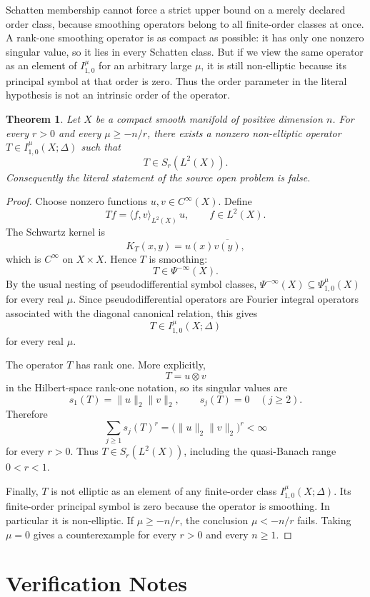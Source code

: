\documentclass[11pt]{article}
\newtheorem{theorem}{Theorem}
\begin{document}
Schatten membership cannot force a strict upper bound on a merely declared
order class, because smoothing operators belong to all finite-order classes at
once.  A rank-one smoothing operator is as compact as possible: it has only one
nonzero singular value, so it lies in every Schatten class.  But if we view the
same operator as an element of \(I^\mu_{1,0}\) for an arbitrary large
\(\mu\), it is still non-elliptic because its principal symbol at that order
is zero.  Thus the order parameter in the literal hypothesis is not an
intrinsic order of the operator.

\begin{theorem}
Let \(X\) be a compact smooth manifold of positive dimension \(n\).  For every
\(r>0\) and every \(\mu\ge -n/r\), there exists a nonzero non-elliptic
operator \(T\in I^\mu_{1,0}(X;\Delta)\) such that
\[
  T\in S_r(L^2(X)).
\]
Consequently the literal statement of the source open problem is false.
\end{theorem}

\begin{proof}
Choose nonzero functions \(u,v\in C^\infty(X)\).  Define
\[
  Tf=\langle f,v\rangle_{L^2(X)}\,u,\qquad f\in L^2(X).
\]
The Schwartz kernel is
\[
  K_T(x,y)=u(x)\overline{v(y)},
\]
which is \(C^\infty\) on \(X\times X\).  Hence \(T\) is smoothing:
\[
  T\in \Psi^{-\infty}(X).
\]
By the usual nesting of pseudodifferential symbol classes,
\(\Psi^{-\infty}(X)\subseteq \Psi^\mu_{1,0}(X)\) for every real \(\mu\).
Since pseudodifferential operators are Fourier integral operators associated
with the diagonal canonical relation, this gives
\[
  T\in I^\mu_{1,0}(X;\Delta)
\]
for every real \(\mu\).

The operator \(T\) has rank one.  More explicitly,
\[
  T = u\otimes v
\]
in the Hilbert-space rank-one notation, so its singular values are
\[
  s_1(T)=\|u\|_2\|v\|_2,\qquad s_j(T)=0\quad(j\ge2).
\]
Therefore
\[
  \sum_{j\ge1}s_j(T)^r = \bigl(\|u\|_2\|v\|_2\bigr)^r<\infty
\]
for every \(r>0\).  Thus \(T\in S_r(L^2(X))\), including the quasi-Banach
range \(0<r<1\).

Finally, \(T\) is not elliptic as an element of any finite-order class
\(I^\mu_{1,0}(X;\Delta)\).  Its finite-order principal symbol is zero because
the operator is smoothing.  In particular it is non-elliptic.  If
\(\mu\ge -n/r\), the conclusion \(\mu<-n/r\) fails.  Taking \(\mu=0\) gives a
counterexample for every \(r>0\) and every \(n\ge1\).
\end{proof}

\section*{Verification Notes}
\end{document}
